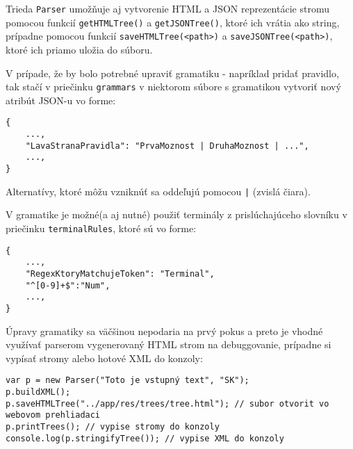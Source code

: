 \documentclass[12pt,a4paper]{report}
\theoremstyle{definition}
\theoremstyle{remark}
\begin{document}
Trieda \verb!Parser! umožňuje aj vytvorenie HTML a JSON reprezentácie stromu pomocou funkcií \verb!getHTMLTree()! a \verb!getJSONTree()!, ktoré ich vrátia ako string, prípadne pomocou funkcií \verb!saveHTMLTree(<path>)! a \verb!saveJSONTree(<path>)!, ktoré ich priamo uložia do súboru.

V prípade, že by bolo potrebné upraviť gramatiku - napríklad pridať pravidlo, tak stačí v priečinku \verb!grammars! v niektorom súbore s gramatikou vytvoriť nový atribút JSON-u vo forme:
 \begin{lstlisting}[style=htmlcssjs]
{
	...,
	"LavaStranaPravidla": "PrvaMoznost | DruhaMoznost | ...",
	...,
}
\end{lstlisting}
Alternatívy, ktoré môžu vzniknúť sa oddeľujú pomocou \verb!|! (zvislá čiara).

V gramatike je možné(a aj nutné) použiť terminály z prislúchajúceho slovníku v priečinku \verb!terminalRules!, ktoré sú vo forme:
\begin{lstlisting}[style=htmlcssjs]
{
	...,
	"RegexKtoryMatchujeToken": "Terminal",
	"^[0-9]+$":"Num",
	...,
}
\end{lstlisting}

Úpravy gramatiky sa väčšinou nepodaria na prvý pokus a preto je vhodné využívať parserom vygenerovaný HTML strom na debuggovanie, prípadne si vypísať stromy alebo hotové XML do konzoly:
\begin{lstlisting}[style=htmlcssjs]
var p = new Parser("Toto je vstupný text", "SK");
p.buildXML();
p.saveHTMLTree("../app/res/trees/tree.html"); // subor otvorit vo webovom prehliadaci
p.printTrees(); // vypise stromy do konzoly
console.log(p.stringifyTree()); // vypise XML do konzoly
\end{lstlisting}
\end{document}

